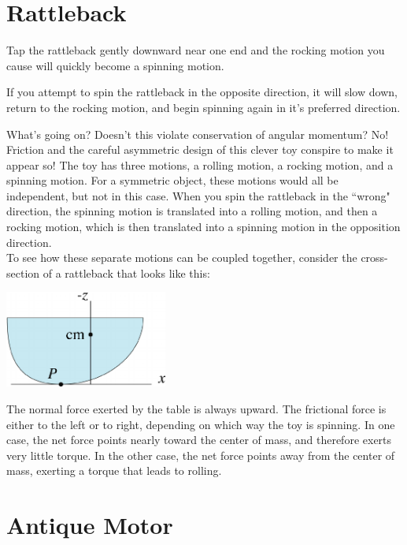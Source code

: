 \documentclass[12pt]{article}
\begin{document}
\section{Rattleback}

Tap the rattleback gently downward near one end and the rocking motion you cause will quickly become a spinning motion.  \\ \vskip 0.5cm

\noindent
If you attempt to spin the rattleback in the opposite direction, it will slow down, return to the rocking motion, and begin spinning again in it's preferred direction. \\ \vskip 0.5cm

\noindent
What's going on?  Doesn't this violate conservation of angular momentum?  No!  Friction and the careful asymmetric design of this clever toy conspire to make it appear so!  The toy has three motions, a rolling motion, a rocking motion, and a spinning motion.  For a symmetric object, these motions would all be independent, but not in this case.  When you spin the rattleback in the ``wrong" direction, the spinning motion is translated into a rolling motion, and then a rocking motion, which is then translated into a spinning motion in the opposition direction.\\

To see how these separate motions can be coupled together, consider the cross-section of a rattleback that looks like this:
\begin{center}
{\includegraphics[width=0.40\textwidth]{figs/rattleback_xsec.png}}
\end{center}
The normal force exerted by the table is always upward.  The frictional force is either to the left or to right, depending on which way the toy is spinning.  In one case, the net force points nearly toward the center of mass, and therefore exerts very little torque.  In the other case, the net force points away from the center of mass, exerting a torque that leads to rolling.

\newpage

\section{Antique Motor}
\end{document}
